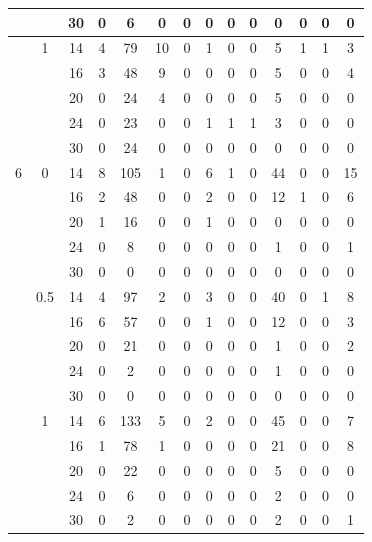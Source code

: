 \documentclass[num-refs]{wiley-article}
\begin{document}
\begin{table}[htbp!]
\begin{tabular}[t]{cccccccccccccc}
& & 30 & 0 & 6 & 0 & 0 & 0 & 0 & 0 & 0 & 0 & 0 & 0\\
\hline
 & 1 & 14 & 4 & 79 & 10 & 0 & 1 & 0 & 0 & 5 & 1 & 1 & 3\\
& & 16 & 3 & 48 & 9 & 0 & 0 & 0 & 0 & 5 & 0 & 0 & 4\\
& & 20 & 0 & 24 & 4 & 0 & 0 & 0 & 0 & 5 & 0 & 0 & 0\\
& & 24 & 0 & 23 & 0 & 0 & 1 & 1 & 1 & 3 & 0 & 0 & 0\\
& & 30 & 0 & 24 & 0 & 0 & 0 & 0 & 0 & 0 & 0 & 0 & 0\\
\hline
6 & 0 & 14 & 8 & 105 & 1 & 0 & 6 & 1 & 0 & 44 & 0 & 0 & 15\\
& & 16 & 2 & 48 & 0 & 0 & 2 & 0 & 0 & 12 & 1 & 0 & 6\\
& & 20 & 1 & 16 & 0 & 0 & 1 & 0 & 0 & 0 & 0 & 0 & 0\\
& & 24 & 0 & 8 & 0 & 0 & 0 & 0 & 0 & 1 & 0 & 0 & 1\\
&& 30 & 0 & 0 & 0 & 0 & 0 & 0 & 0 & 0 & 0 & 0 & 0\\
\hline
 & 0.5 & 14 & 4 & 97 & 2 & 0 & 3 & 0 & 0 & 40 & 0 & 1 & 8\\
& & 16 & 6 & 57 & 0 & 0 & 1 & 0 & 0 & 12 & 0 & 0 & 3\\
& & 20 & 0 & 21 & 0 & 0 & 0 & 0 & 0 & 1 & 0 & 0 & 2\\
& & 24 & 0 & 2 & 0 & 0 & 0 & 0 & 0 & 1 & 0 & 0 & 0\\
& & 30 & 0 & 0 & 0 & 0 & 0 & 0 & 0 & 0 & 0 & 0 & 0\\
\hline
 & 1 & 14 & 6 & 133 & 5 & 0 & 2 & 0 & 0 & 45 & 0 & 0 & 7\\
& & 16 & 1 & 78 & 1 & 0 & 0 & 0 & 0 & 21 & 0 & 0 & 8\\
& & 20 & 0 & 22 & 0 & 0 & 0 & 0 & 0 & 5 & 0 & 0 & 0\\
& & 24 & 0 & 6 & 0 & 0 & 0 & 0 & 0 & 2 & 0 & 0 & 0\\
& & 30 & 0 & 2 & 0 & 0 & 0 & 0 & 0 & 2 & 0 & 0 & 1\\
\hline
\end{tabular}
\label{scen1:issues}
\end{table}
\end{document}
